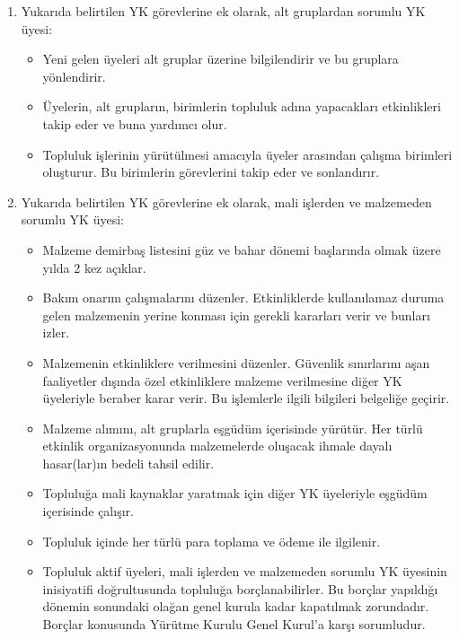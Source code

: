 \documentclass[11pt,a4paper]{article}
\begin{document}
\begin{enumerate}
\begin{itemize}
        \item Mail listelerini yönetir. Listeye üye ekleme ve Yürütme Kurulu’nun onayı ile çıkarma işlemlerini yapar, gereği halinde moderatörlük verir.
        \item SÖRF web sitesine içerik eklenmesini ve web sitesinin düzenlenmesini organize eder.
    \end{itemize}
    \item Yukarıda belirtilen YK görevlerine ek olarak, alt gruplardan sorumlu YK üyesi:
    \begin{itemize}
        \item Yeni gelen üyeleri alt gruplar üzerine bilgilendirir ve bu gruplara yönlendirir.
        \item Üyelerin, alt grupların, birimlerin topluluk adına yapacakları etkinlikleri takip eder ve buna yardımcı olur.
        \item Topluluk işlerinin yürütülmesi amacıyla üyeler arasından çalışma birimleri oluşturur. Bu birimlerin görevlerini takip eder ve sonlandırır.
    \end{itemize}
    \item Yukarıda belirtilen YK görevlerine ek olarak, mali işlerden ve malzemeden sorumlu YK üyesi:
    \begin{itemize}
        \item Malzeme demirbaş listesini güz ve bahar dönemi başlarında olmak üzere yılda 2 kez açıklar.
        \item Bakım onarım çalışmalarını düzenler. Etkinliklerde kullanılamaz duruma gelen malzemenin yerine konması için gerekli kararları verir ve bunları izler.
        \item Malzemenin etkinliklere verilmesini düzenler. Güvenlik sınırlarını aşan faaliyetler dışında özel etkinliklere malzeme verilmesine diğer YK üyeleriyle beraber karar verir. Bu işlemlerle ilgili bilgileri belgeliğe geçirir.
        \item Malzeme alımını, alt gruplarla eşgüdüm içerisinde yürütür. Her türlü etkinlik organizasyonunda malzemelerde oluşacak ihmale dayalı hasar(lar)ın bedeli tahsil edilir.
        \item Topluluğa mali kaynaklar yaratmak için diğer YK üyeleriyle eşgüdüm içerisinde çalışır.
        \item Topluluk içinde her türlü para toplama ve ödeme ile ilgilenir.
        \item Topluluk aktif üyeleri, mali işlerden ve malzemeden sorumlu YK üyesinin inisiyatifi doğrultusunda topluluğa borçlanabilirler. Bu borçlar yapıldığı dönemin sonundaki olağan genel kurula kadar kapatılmak zorundadır. Borçlar konusunda Yürütme Kurulu Genel Kurul’a karşı sorumludur.

\end{itemize}
\end{enumerate}
\end{document}
